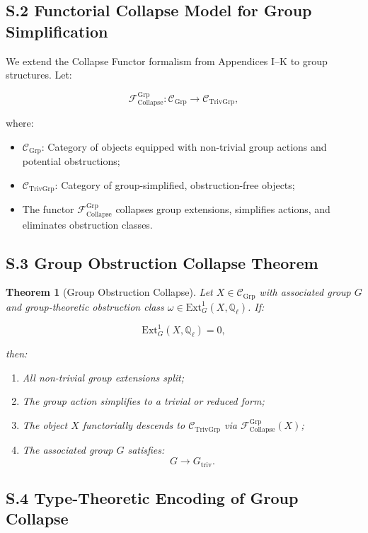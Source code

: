 \documentclass[11pt]{article}
\newtheorem{theorem}{Theorem}[section]
\begin{document}
\subsection*{S.2 Functorial Collapse Model for Group Simplification}

We extend the Collapse Functor formalism from Appendices I–K to group structures. Let:

\[
\mathcal{F}_{\mathrm{Collapse}}^{\mathrm{Grp}} : \mathcal{C}_{\mathrm{Grp}} \longrightarrow \mathcal{C}_{\mathrm{TrivGrp}},
\]

where:
\begin{itemize}
    \item $\mathcal{C}_{\mathrm{Grp}}$: Category of objects equipped with non-trivial group actions and potential obstructions;
    \item $\mathcal{C}_{\mathrm{TrivGrp}}$: Category of group-simplified, obstruction-free objects;
    \item The functor $\mathcal{F}_{\mathrm{Collapse}}^{\mathrm{Grp}}$ collapses group extensions, simplifies actions, and eliminates obstruction classes.
\end{itemize}

\subsection*{S.3 Group Obstruction Collapse Theorem}

\begin{theorem}[Group Obstruction Collapse]
Let $X \in \mathcal{C}_{\mathrm{Grp}}$ with associated group $G$ and group-theoretic obstruction class $\omega \in \mathrm{Ext}^1_G(X, \mathbb{Q}_\ell)$. If:

\[
\mathrm{Ext}^1_G(X, \mathbb{Q}_\ell) = 0,
\]

then:
\begin{enumerate}
    \item All non-trivial group extensions split;
    \item The group action simplifies to a trivial or reduced form;
    \item The object $X$ functorially descends to $\mathcal{C}_{\mathrm{TrivGrp}}$ via $\mathcal{F}_{\mathrm{Collapse}}^{\mathrm{Grp}}(X)$;
    \item The associated group $G$ satisfies:
    \[
    G \longrightarrow G_{\mathrm{triv}}.
    \]
\end{enumerate}
\end{theorem}

\subsection*{S.4 Type-Theoretic Encoding of Group Collapse}
\end{document}
